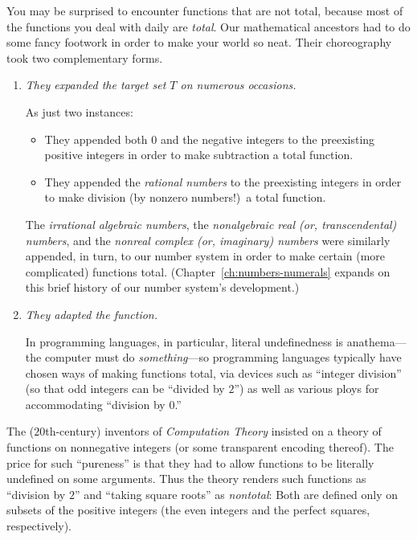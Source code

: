 
\medskip

You may be surprised to encounter functions that are not total, because most of the functions you deal with daily are {\em total}.  Our mathematical ancestors had to do some fancy footwork in order to make your world so neat.  Their choreography took two complementary forms.
\begin{enumerate}
\item
{\em They expanded the target set $T$ on numerous occasions.}

\smallskip

As just two instances:
  \begin{itemize}
  \item
They appended both $0$ and the negative integers to the preexisting positive integers in order to make subtraction a total function.

  \item
They appended the {\it rational numbers} to the preexisting integers in order to make division (by nonzero numbers!)~a total function.
  \end{itemize}
The {\it irrational algebraic numbers}, the {\it nonalgebraic real (or, transcendental) numbers}, and the {\it nonreal complex (or, imaginary) numbers} were similarly appended, in turn, to our number system in order to make certain (more complicated) functions total.  (Chapter~\ref{ch:numbers-numerals} expands on this brief history of our number system's development.)

\item
{\em They adapted the function.}

\smallskip

In programming languages, in particular, literal undefinedness is anathema---the computer must do {\em something}---so programming languages typically have chosen ways of making functions total, via devices such as ``integer division'' (so that odd integers can be ``divided by $2$'') as well as various ploys for accommodating ``division by $0$.''
\end{enumerate}
The ($20$th-century) inventors of {\em Computation Theory} insisted on a theory of functions on nonnegative integers (or some transparent encoding thereof).  The price for such ``pureness'' is that they had to allow functions to be literally undefined on some arguments.  Thus the theory renders such functions as ``division by $2$'' and ``taking square roots'' as {\em nontotal}: Both are defined only on subsets of the positive integers (the even integers and the perfect squares, respectively).

